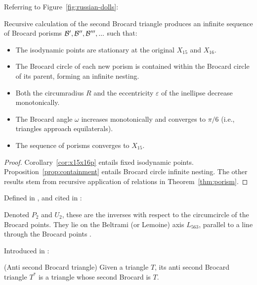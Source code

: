 
\noindent Referring to Figure~\ref{fig:russian-dolls}:

\begin{theorem}
Recursive calculation of the second Brocard triangle produces an infinite sequence of Brocard porisms $\mathcal{B}',\mathcal{B}'',\mathcal{B}''',...$ such that:
\begin{itemize}
    \item The isodynamic points are stationary at the original $X_{15}$ and $X_{16}$.
\item The Brocard circle of each new porism is contained within the Brocard circle of its parent, forming an infinite nesting.
\item Both the circumradius $R$ and the eccentricity $\varepsilon$ of the inellipse decrease monotonically.
\item The Brocard angle $\omega$ increases monotonically and converges to $\pi/6$ (i.e., triangles approach equilaterals).
\item The sequence of porisms converges to $X_{15}$.
\end{itemize}
\label{thm:nesting}
\end{theorem}

\begin{proof}
Corollary~\ref{cor:x15x16p} entails fixed isodynamic points. Proposition~\ref{prop:containment} entails Brocard circle infinite nesting. The other results stem from recursive application of relations in Theorem~\ref{thm:porism}.
\end{proof}

\noindent Defined in \cite[p. 78]{morley54}, and cited in  \cite[P(2)]{etc-bicentric}:

\begin{definition}
Denoted $P_2$ and $U_2$, these are the inverses with respect to the circumcircle of the Brocard points. They lie on the Beltrami (or Lemoine) axis $L_{563}$, parallel to a line through the Brocard points \cite[Central Lines]{etc}.
\end{definition}

\noindent Introduced in \cite{gibert2020-anti-brocard}:

\begin{definition}(Anti second Brocard triangle)
Given a triangle $T$, its anti second Brocard triangle $T^*$ is a triangle whose second Brocard is $T$. 
\end{definition}


